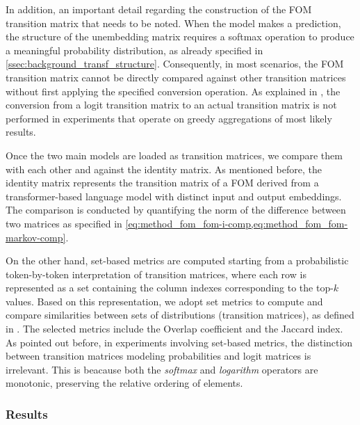 In addition, an important detail regarding the construction of the FOM transition matrix that needs to be noted.
When the model makes a prediction, the structure of the unembedding matrix requires a softmax operation to produce a meaningful probability distribution, as already specified in \cref{ssec:background_transf_structure}.
Consequently, in most scenarios, the FOM transition matrix cannot be directly compared against other transition matrices without first applying the specified conversion operation.
As explained in , the conversion from a logit transition matrix to an actual transition matrix is not performed in experiments that operate on greedy aggregations of most likely results.

Once the two main models are loaded as transition matrices, we compare them with each other and against the identity matrix.
As mentioned before, the identity matrix represents the transition matrix of a FOM derived from a transformer-based language model with distinct input and output embeddings.
The comparison is conducted by quantifying the norm of the difference between two matrices as specified in \cref{eq:method_fom_fom-i-comp,eq:method_fom_fom-markov-comp}.

On the other hand, set-based metrics are computed starting from a probabilistic token-by-token interpretation of transition matrices, where each row is represented as a set containing the column indexes corresponding to the top-$k$ values.
Based on this representation, we adopt set metrics to compute and compare similarities between sets of distributions (transition matrices), as defined in .
The selected metrics include the Overlap coefficient and the Jaccard index.
As pointed out before, in experiments involving set-based metrics, the distinction between  transition matrices modeling probabilities and logit matrices is irrelevant.
This is beacause both the \emph{softmax} and \emph{logarithm} operators are monotonic, preserving the relative ordering of elements.

\subsubsection{Results}\label{sssec:exp_fom_exp1_results}

